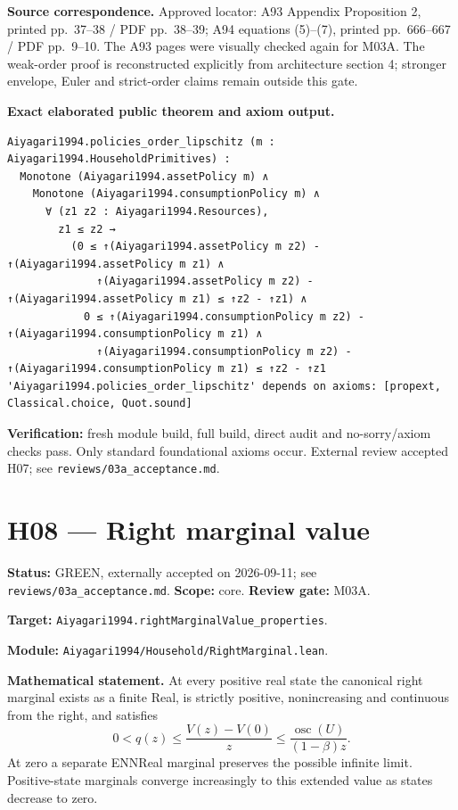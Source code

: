 \documentclass[
  11pt,
]{article}
\let\LedgerOriginalTexttt\texttt
\renewcommand{\texttt}[1]{{\small\LedgerOriginalTexttt{#1}}}
\begin{document}
\textbf{Source correspondence.} Approved locator: A93 Appendix
Proposition 2, printed pp.~37--38 / PDF pp.~38--39; A94 equations
(5)--(7), printed pp.~666--667 / PDF pp.~9--10. The A93 pages were
visually checked again for M03A. The weak-order proof is reconstructed
explicitly from architecture section 4; stronger envelope, Euler and
strict-order claims remain outside this gate.

\textbf{Exact elaborated public theorem and axiom output.}

\begin{verbatim}
Aiyagari1994.policies_order_lipschitz (m : Aiyagari1994.HouseholdPrimitives) :
  Monotone (Aiyagari1994.assetPolicy m) ∧
    Monotone (Aiyagari1994.consumptionPolicy m) ∧
      ∀ (z1 z2 : Aiyagari1994.Resources),
        z1 ≤ z2 →
          (0 ≤ ↑(Aiyagari1994.assetPolicy m z2) - ↑(Aiyagari1994.assetPolicy m z1) ∧
              ↑(Aiyagari1994.assetPolicy m z2) - ↑(Aiyagari1994.assetPolicy m z1) ≤ ↑z2 - ↑z1) ∧
            0 ≤ ↑(Aiyagari1994.consumptionPolicy m z2) - ↑(Aiyagari1994.consumptionPolicy m z1) ∧
              ↑(Aiyagari1994.consumptionPolicy m z2) - ↑(Aiyagari1994.consumptionPolicy m z1) ≤ ↑z2 - ↑z1
'Aiyagari1994.policies_order_lipschitz' depends on axioms: [propext, Classical.choice, Quot.sound]
\end{verbatim}

\textbf{Verification:} fresh module build, full build, direct audit and
no-sorry/axiom checks pass. Only standard foundational axioms occur.
External review accepted H07; see \texttt{reviews/03a\_acceptance.md}.

\section{H08 --- Right marginal value}\label{h08-right-marginal-value}

\textbf{Status:} GREEN, externally accepted on 2026-09-11; see
\texttt{reviews/03a\_acceptance.md}. \textbf{Scope:} core.
\textbf{Review gate:} M03A.

\textbf{Target:} \texttt{Aiyagari1994.rightMarginalValue\_properties}.

\textbf{Module:} \texttt{Aiyagari1994/Household/RightMarginal.lean}.

\textbf{Mathematical statement.} At every positive real state the
canonical right marginal exists as a finite Real, is strictly positive,
nonincreasing and continuous from the right, and satisfies
\[0<q(z)\leq\frac{V(z)-V(0)}z\leq\frac{\operatorname{osc}(U)}{(1-\beta)z}.\]
At zero a separate ENNReal marginal preserves the possible infinite
limit. Positive-state marginals converge increasingly to this extended
value as states decrease to zero.
\end{document}
